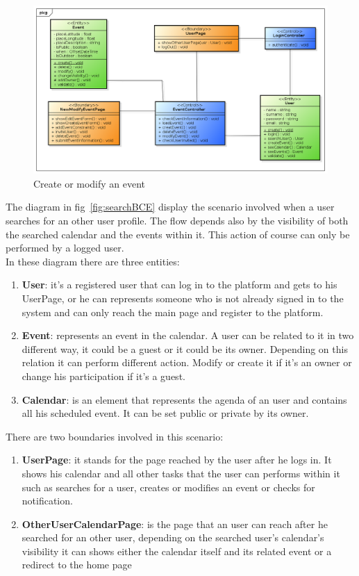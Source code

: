 \begin{center}
 \begin{figure}[H]
    \includegraphics[width=1\textwidth]{./BCEDiagram/BCE/EntityOverview/EventManagementBCE.png}
    \caption{Create or modify an event}
     \label{fig:editneweventBCE}
     \end{figure}
   \end{center}  
The diagram in fig~\ref{fig:searchBCE} display the scenario involved when a user searches for an other user profile. The flow depends also by the visibility of both the searched calendar and the events within it. This action of course can only be performed by a logged user.\\
In these diagram there are three entities:
\begin{enumerate}
\item {\bf User}: it's a registered user that can log in to the platform and gets to his UserPage, or he can represents someone who is not already signed in to the system and can only reach the main page and register to the platform.
\item {\bf Event}: represents an event in the calendar. A user can be related to it in two different way, it could be a guest or it could be its owner. Depending on this relation it can perform different action. Modify or create it if it's an owner or change his participation if it's a guest.
\item {\bf Calendar}: is an element that represents the agenda of an user and contains all his scheduled event. It can be set public or private by its owner.
\end{enumerate}
There are two boundaries involved in this scenario: \begin{enumerate}
\item {\bf UserPage}: it stands for the page reached by the user after he logs in. It shows his calendar and all other tasks that the user can performs within it such as searches for a user, creates or modifies an event or checks for notification.
 \item {\bf OtherUserCalendarPage}: is the page that an user can reach after he searched for an other user, depending on the searched user's calendar's visibility it can shows either the calendar itself and its related event or a redirect to the home page
 \end{enumerate}
